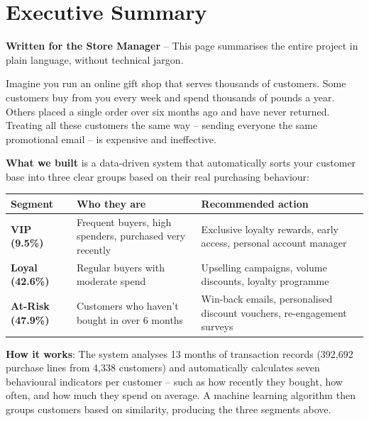 \documentclass[12pt,a4paper]{report}
\begin{document}
\chapter*{Executive Summary}
\thispagestyle{fancy}

\begin{infobox}
\textbf{Written for the Store Manager} -- This page summarises the entire project in plain language, without technical jargon.
\end{infobox}

\vspace{0.4cm}

Imagine you run an online gift shop that serves thousands of customers. Some customers buy from you every week and spend thousands of pounds a year. Others placed a single order over six months ago and have never returned. Treating all these customers the same way -- sending everyone the same promotional email -- is expensive and ineffective.

\textbf{What we built} is a data-driven system that automatically sorts your customer base into three clear groups based on their real purchasing behaviour:

\begin{center}
\begin{tabular}{>{\bfseries}p{2.2cm} p{4.5cm} p{6cm}}
\toprule
\textbf{Segment} & \textbf{Who they are} & \textbf{Recommended action} \\
\midrule
\textcolor{vipgold}{\textbf{VIP}} (9.5\%) & Frequent buyers, high spenders, purchased very recently & Exclusive loyalty rewards, early access, personal account manager \\[4pt]
\textcolor{loyalgreen}{\textbf{Loyal}} (42.6\%) & Regular buyers with moderate spend & Upselling campaigns, volume discounts, loyalty programme \\[4pt]
\textcolor{riskred}{\textbf{At-Risk}} (47.9\%) & Customers who haven't bought in over 6 months & Win-back emails, personalised discount vouchers, re-engagement surveys \\
\bottomrule
\end{tabular}
\end{center}

\vspace{0.3cm}

\textbf{How it works}: The system analyses 13 months of transaction records (392,692 purchase lines from 4,338 customers) and automatically calculates seven behavioural indicators per customer -- such as how recently they bought, how often, and how much they spend on average. A machine learning algorithm then groups customers based on similarity, producing the three segments above.
\end{document}
